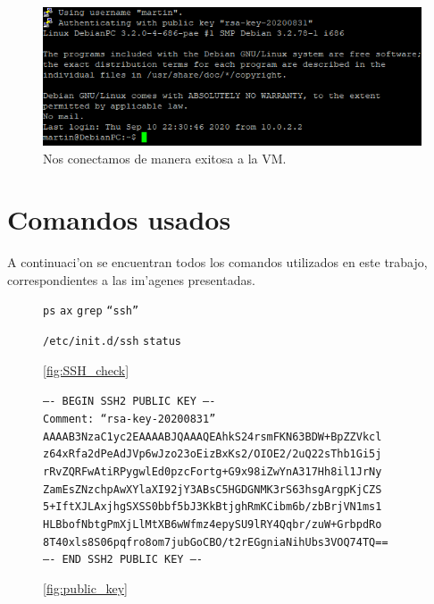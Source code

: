 \documentclass[11pt]{article}
\newcommand{\imagecaption}[1]{\vspace{-7pt}\caption*{\char91\ref{fig:#1}\char93}}
\newcommand{\codetext}[2]{\large\texttt{\textcolor{#1}{#2}}}
\begin{document}
		\begin{figure}[H]
    			\centering
    			\includegraphics[scale=0.75]{Images/Connection/final_connection.PNG}
    			\caption{Nos conectamos de manera exitosa a la VM.}
    			\label{fig:final_connection}
		\end{figure}
		
	\section{Comandos usados}
		A continuaci'on se encuentran todos los comandos utilizados en este trabajo, correspondientes a las im'agenes presentadas.
		
		\begin{figure}[H]
			\centering
			\begin{code-box}
				\codetext{light-blue}{ps} \codetext{light-orange}{ax} \textbar\/ \codetext{light-blue}{grep} \codetext{light-red}{``ssh''}
				
				\codetext{light-blue}{/etc/init.d/ssh} \codetext{light-orange}{status}
			\end{code-box}
			\imagecaption{SSH_check}
		\end{figure}
		
		\begin{figure}[H]
			\centering
			\begin{code-box}
				\codetext{dark-gray}{---- BEGIN SSH2 PUBLIC KEY ----\\
				Comment: ``rsa-key-20200831''\\
				AAAAB3NzaC1yc2EAAAABJQAAAQEAhkS24rsmFKN63BDW+BpZZVkcl
				z64xRfa2dPeAdJVp6wJzo23oEizBxKs2/OIOE2/2uQ22sThb1Gi5j
				rRvZQRFwAtiRPygwlEd0pzcFortg+G9x98iZwYnA317Hh8il1JrNy
				ZamEsZNzchpAwXYlaXI92jY3ABsC5HGDGNMK3rS63hsgArgpKjCZS
				5+IftXJLAxjhgSXSS0bbf5bJ3KkBtjghRmKCibm6b/zbBrjVN1ms1
				HLBbofNbtgPmXjLlMtXB6wWfmz4epySU9lRY4Qqbr/zuW+GrbpdRo
				8T40xls8S06pqfro8om7jubGoCBO/t2rEGgniaNihUbs3VOQ74TQ==\\
				---- END SSH2 PUBLIC KEY ----}
			\end{code-box}
			\imagecaption{public_key}
		\end{figure}
		
\end{document}
